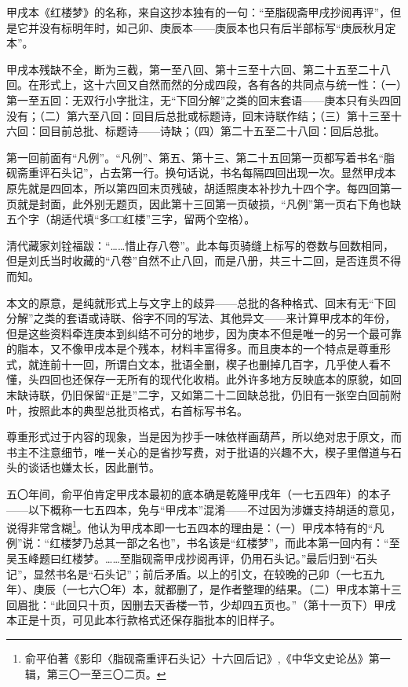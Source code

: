 \par 甲戌本《红楼梦》的名称，来自这抄本独有的一句：“至脂砚斋甲戌抄阅再评”，但是它并没有标明年时，如己卯、庚辰本——庚辰本也只有后半部标写“庚辰秋月定本”。
\par 甲戌本残缺不全，断为三截，第一至八回、第十三至十六回、第二十五至二十八回。在形式上，这十六回又自然而然的分成四段，各有各的共同点与统一性：（一）第一至五回：无双行小字批注，无“下回分解”之类的回末套语——庚本只有头四回没有；（二）第六至八回：回目后总批或标题诗，回末诗联作结；（三）第十三至十六回：回目前总批、标题诗——诗缺；（四）第二十五至二十八回：回后总批。
\par 第一回前面有“凡例”。“凡例”、第五、第十三、第二十五回第一页都写着书名“脂砚斋重评石头记”，占去第一行。换句话说，书名每隔四回出现一次。显然甲戌本原先就是四回本，所以第四回末页残破，胡适照庚本补抄九十四个字。每四回第一页就是封面，此外别无题页，因此第十三回第一页破损，“凡例”第一页右下角也缺五个字（胡适代填“多□□红楼”三字，留两个空格）。
\par 清代藏家刘铨福跋：“……惜止存八卷”。此本每页骑缝上标写的卷数与回数相同，但是刘氏当时收藏的“八卷”自然不止八回，而是八册，共三十二回，是否连贯不得而知。
\par 本文的原意，是纯就形式上与文字上的歧异——总批的各种格式、回末有无“下回分解”之类的套语或诗联、俗字不同的写法、其他异文——来计算甲戌本的年份，但是这些资料牵连庚本到纠结不可分的地步，因为庚本不但是唯一的另一个最可靠的脂本，又不像甲戌本是个残本，材料丰富得多。而且庚本的一个特点是尊重形式，就连前十一回，所谓白文本，批语全删，楔子也删掉几百字，几乎使人看不懂，头四回也还保存一无所有的现代化收梢。此外许多地方反映底本的原貌，如回末缺诗联，仍旧保留“正是”二字，又如第二十二回缺总批，仍旧有一张空白回前附叶，按照此本的典型总批页格式，右首标写书名。
\par 尊重形式过于内容的现象，当是因为抄手一味依样画葫芦，所以绝对忠于原文，而书主不注意细节，唯一关心的是省抄写费，对于批语的兴趣不大，楔子里僧道与石头的谈话也嫌太长，因此删节。
\par 五〇年间，俞平伯肯定甲戌本最初的底本确是乾隆甲戌年（一七五四年）的本子——以下概称一七五四本，免与“甲戌本”混淆——不过因为涉嫌支持胡适的意见，说得非常含糊\footnote{俞平伯著《影印〈脂砚斋重评石头记〉十六回后记》,《中华文史论丛》第一辑，第三〇一至三〇二页。}。他认为甲戌本即一七五四本的理由是：（一）甲戌本特有的“凡例”说：“红楼梦乃总其一部之名也”，书名该是“红楼梦”，而此本第一回内有：“至吴玉峰题曰红楼梦。……至脂砚斋甲戌抄阅再评，仍用石头记。”最后归到“石头记”，显然书名是“石头记”；前后矛盾。以上的引文，在较晚的己卯（一七五九年）、庚辰（一七六〇年）本，就都删了，是作者整理的结果。（二）甲戌本第十三回眉批：“此回只十页，因删去天香楼一节，少却四五页也。”（第十一页下）甲戌本正是十页，可见此本行款格式还保存脂批本的旧样子。
